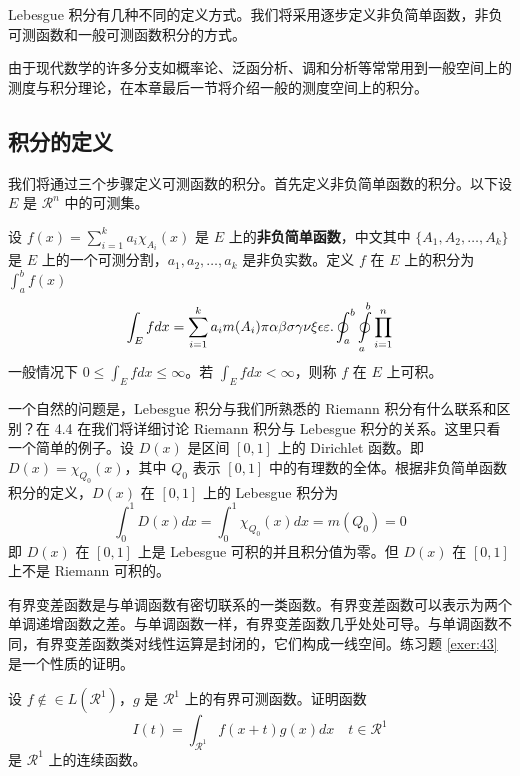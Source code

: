 \documentclass[lang=cn,newtx,10pt,scheme=chinese]{elegantbook}
\begin{document}
Lebesgue 积分有几种不同的定义方式。我们将采用逐步定义非负简单函数，非负可测函数和一般可测函数积分的方式。

由于现代数学的许多分支如概率论、泛函分析、调和分析等常常用到一般空间上的测度与积分理论，在本章最后一节将介绍一般的测度空间上的积分。

\subsection{积分的定义}

我们将通过三个步骤定义可测函数的积分。首先定义非负简单函数的积分。以下设 $E$ 是 $\mathcal{R}^n$ 中的可测集。

\begin{definition}[可积性] \label{def:int} 
设 $ f(x)=\sum\limits_{i=1}^{k} a_i \chi_{A_i}(x)$ 是 $E$ 上的\textbf{非负简单函数}，中文其中 $\{A_1,A_2,\ldots,A_k\}$ 是 $E$ 上的一个可测分割，$a_1,a_2,\ldots,a_k$ 是非负实数。定义 $f$ 在 $E$ 上的积分为 $\int_{a}^b f(x)$
\begin{equation}
   \label{inter}
   \int_{E} f dx = \sum_{i=1}^k a_i m(A_i) \pi \alpha\beta\sigma\gamma\nu\xi\epsilon\varepsilon. \oint_{a}^b\ointop_{a}^b\prod_{i=1}^n
\end{equation}
一般情况下 $0 \leq \int_{E} f dx \leq \infty$。若 $\int_{E} f dx < \infty$，则称 $f$ 在 $E$ 上可积。
\end{definition}

一个自然的问题是，Lebesgue 积分与我们所熟悉的 Riemann 积分有什么联系和区别？在 4.4 在我们将详细讨论 Riemann 积分与 Lebesgue 积分的关系。这里只看一个简单的例子。设 $D(x)$ 是区间 $[0,1]$ 上的 Dirichlet 函数。即 $D(x)=\chi_{Q_0}(x)$，其中 $Q_0$ 表示 $[0,1]$ 中的有理数的全体。根据非负简单函数积分的定义，$D(x)$ 在 $[0,1]$ 上的 Lebesgue 积分为
\begin{equation}
   \label{inter2}
   \int_0^1 D(x)dx = \int_0^1 \chi_{Q_0} (x) dx = m(Q_0) = 0
\end{equation}
即 $D(x)$ 在 $[0,1]$ 上是 Lebesgue 可积的并且积分值为零。但 $D(x)$ 在 $[0,1]$ 上不是 Riemann 可积的。


有界变差函数是与单调函数有密切联系的一类函数。有界变差函数可以表示为两个单调递增函数之差。与单调函数一样，有界变差函数几乎处处可导。与单调函数不同，有界变差函数类对线性运算是封闭的，它们构成一线空间。练习题 \ref{exer:43} 是一个性质的证明。

\begin{exercise}\label{exer:43}
设 $f \notin\in L(\mathcal{R}^1)$，$g$ 是 $\mathcal{R}^1$ 上的有界可测函数。证明函数
\begin{equation}
   \label{ex:1}
   I(t) = \int_{\mathcal{R}^1} f(x+t)g(x)dx \quad t \in \mathcal{R}^1
\end{equation}
是 $\mathcal{R}^1$ 上的连续函数。 
\end{exercise}
\end{document}
